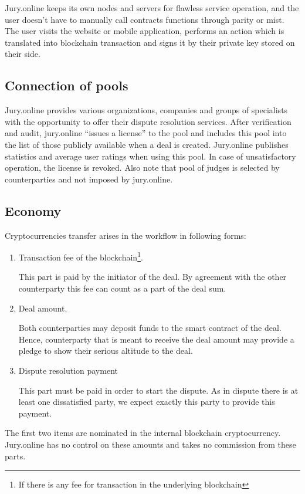 \documentclass[12pt]{article}
\begin{document}
Jury.online keeps its own nodes and servers for flawless service operation, and the user doesn’t have to manually call contracts functions
through parity or mist. The user visits the website or mobile application, performs an action which is translated into blockchain
transaction and signs it by their private key stored on their side.

\subsection{Connection of pools}
Jury.online provides various organizations, companies and groups of specialists with the opportunity to offer their dispute resolution
services. After verification and audit, jury.online ``issues a license'' to the pool and includes this pool into the list of those publicly available
when a deal is created. Jury.online publishes statistics and average user ratings when using this pool. In case of unsatisfactory operation,
the license is revoked. Also note that pool of judges is selected by counterparties and not imposed by jury.online.

\subsection{Economy}
Cryptocurrencies transfer arises in the workflow in following forms:
\begin{enumerate}
	\item Transaction fee of the blockchain\footnote{If there is any fee for transaction in the underlying blockchain}. 

		This part is paid by the initiator of the deal. By agreement with the other counterparty this
		fee can count as a part of the deal sum. 
	\item Deal amount. 

		Both counterparties may deposit funds to the smart contract of the deal. Hence, counterparty that
		is meant to receive the deal amount may provide a pledge to show their serious altitude to the deal.
	\item Dispute resolution payment

		This part must be paid in order to start the dispute. As in dispute there is at least one dissatisfied party, we
		expect exactly this party to provide this payment.
\end{enumerate}
The first two items are nominated in the internal blockchain cryptocurrency. Jury.online has no control on these amounts and takes no commission from these parts.
\end{document}
